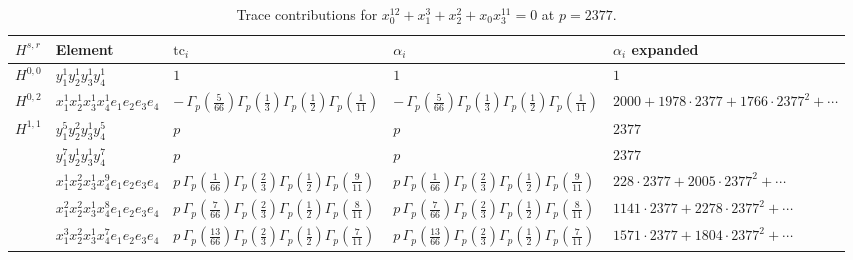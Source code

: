 \documentclass[11pt]{article}
\begin{document}
\begin{table}[ht]
\centering
\caption{Trace contributions for $x_0^{12} + x_1^{3} + x_2^{2} + x_0 x_3^{11} = 0$ at $p=2377$.}\label{tab:deformed-20}
\renewcommand{\arraystretch}{1.1}
{\scriptsize
\begin{tabular}{@{}lllll@{}}
\toprule
$H^{s,r}$ & Element & $\mathrm{tc}_i$ & $\alpha_i$ & $\alpha_i$ expanded \\
\midrule
$H^{0,0}$ & $y_{1}^{1} y_{2}^{1} y_{3}^{1} y_{4}^{1}$ & $1$ & $1$ & $1$ \\
\midrule
$H^{0,2}$ & $x_{1}^{1} x_{2}^{1} x_{3}^{1} x_{4}^{1}  e_{1} e_{2} e_{3} e_{4}$ & $- \, \Gamma_p \left( \frac{5}{66} \right) \Gamma_p \left( \frac{1}{3} \right) \Gamma_p \left( \frac{1}{2} \right) \Gamma_p \left( \frac{1}{11} \right)$ & $- \, \Gamma_p \left( \frac{5}{66} \right) \Gamma_p \left( \frac{1}{3} \right) \Gamma_p \left( \frac{1}{2} \right) \Gamma_p \left( \frac{1}{11} \right)$ & $2000{+}1978{\cdot}2377{+}1766{\cdot}2377^{2}{+}\cdots$ \\
\midrule
$H^{1,1}$ & $y_{1}^{5} y_{2}^{2} y_{3}^{1} y_{4}^{5}$ & $p \,$ & $p \,$ & $2377$ \\
 & $y_{1}^{7} y_{2}^{1} y_{3}^{1} y_{4}^{7}$ & $p \,$ & $p \,$ & $2377$ \\
 & $x_{1}^{1} x_{2}^{2} x_{3}^{1} x_{4}^{9}  e_{1} e_{2} e_{3} e_{4}$ & $p \, \Gamma_p \left( \frac{1}{66} \right) \Gamma_p \left( \frac{2}{3} \right) \Gamma_p \left( \frac{1}{2} \right) \Gamma_p \left( \frac{9}{11} \right)$ & $p \, \Gamma_p \left( \frac{1}{66} \right) \Gamma_p \left( \frac{2}{3} \right) \Gamma_p \left( \frac{1}{2} \right) \Gamma_p \left( \frac{9}{11} \right)$ & $228{\cdot}2377{+}2005{\cdot}2377^{2}{+}\cdots$ \\
 & $x_{1}^{2} x_{2}^{2} x_{3}^{1} x_{4}^{8}  e_{1} e_{2} e_{3} e_{4}$ & $p \, \Gamma_p \left( \frac{7}{66} \right) \Gamma_p \left( \frac{2}{3} \right) \Gamma_p \left( \frac{1}{2} \right) \Gamma_p \left( \frac{8}{11} \right)$ & $p \, \Gamma_p \left( \frac{7}{66} \right) \Gamma_p \left( \frac{2}{3} \right) \Gamma_p \left( \frac{1}{2} \right) \Gamma_p \left( \frac{8}{11} \right)$ & $1141{\cdot}2377{+}2278{\cdot}2377^{2}{+}\cdots$ \\
 & $x_{1}^{3} x_{2}^{2} x_{3}^{1} x_{4}^{7}  e_{1} e_{2} e_{3} e_{4}$ & $p \, \Gamma_p \left( \frac{13}{66} \right) \Gamma_p \left( \frac{2}{3} \right) \Gamma_p \left( \frac{1}{2} \right) \Gamma_p \left( \frac{7}{11} \right)$ & $p \, \Gamma_p \left( \frac{13}{66} \right) \Gamma_p \left( \frac{2}{3} \right) \Gamma_p \left( \frac{1}{2} \right) \Gamma_p \left( \frac{7}{11} \right)$ & $1571{\cdot}2377{+}1804{\cdot}2377^{2}{+}\cdots$ \\

\end{tabular}}
\end{table}
\end{document}

